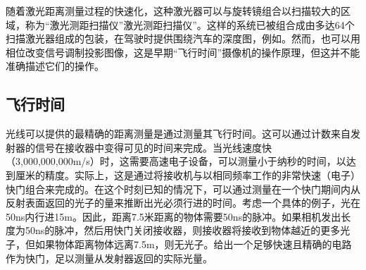随着激光距离测量过程的快速化，这种激光器可以与旋转镜组合以扫描较大的区域，称为“激光测距扫描仪”\“激光测距扫描仪”。这样的系统已被组合成由多达64个扫描激光器组成的包装，在驾驶时提供围绕汽车的深度图，例如。然而，也可以用相位改变信号调制投影图像，这是早期“飞行时间”摄像机的操作原理，但这并不能准确描述它们的操作。




\subsection{飞行时间}
光线可以提供的最精确的距离测量是通过测量其飞行时间。这可以通过计数来自发射器的信号在接收器中变得可见的时间来完成。当光线速度快（3,000,000,000m/s）时，这需要高速电子设备，可以测量小于纳秒的时间，以达到厘米的精度。实际上，这是通过将接收机与以相同频率工作的非常快速（电子）快门组合来完成的。在这个时刻已知的情况下，可以通过测量在一个快门期间内从反射表面返回的光子的量来推断出光必须行进的时间。考虑一个具体的例子，光在50ns内行进15m。因此，距离7.5米距离的物体需要50ns的脉冲。如果相机发出长度为50ns的脉冲，然后用快门关闭接收器，则接收器将接收到物体越近的更多光子，但如果物体距离物体远离7.5m，则无光​​子。给出一个足够快速且精确的电路作为快门，足以测量从发射器返回的实际光量。


